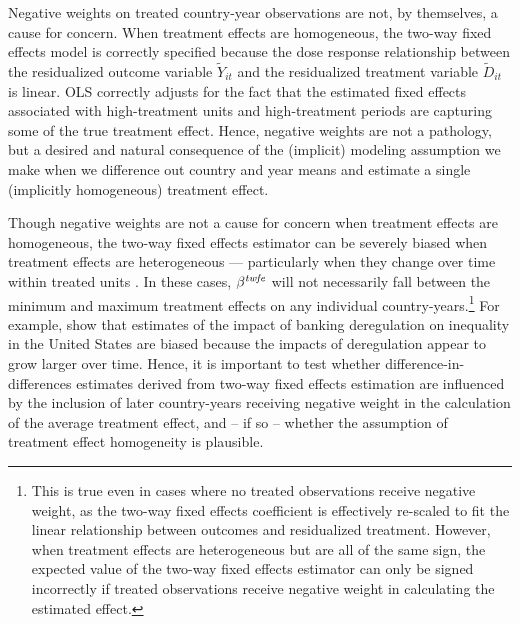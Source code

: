 \documentclass[11pt]{article}
\begin{document}
Negative weights on treated country-year observations are not, by themselves, a cause for concern.  When treatment effects are 
homogeneous, the two-way fixed effects model is correctly specified because the dose response relationship 
between the residualized outcome variable $\tilde{Y}_{it}$ and the residualized treatment variable $\tilde{D}_{it}$ is linear.  
OLS correctly adjusts for the fact that the estimated fixed effects associated with high-treatment units and high-treatment periods are capturing some of the true treatment effect.  Hence, negative weights are not a pathology, but a desired and natural consequence of the (implicit) modeling assumption we make when we difference out country and year means and estimate a single (implicitly homogeneous) treatment effect.


Though negative weights are not a cause for concern when treatment effects are homogeneous, the two-way fixed effects 
estimator can be severely biased when treatment effects are heterogeneous --- particularly when they change over time 
within treated units \cite{Chaisemartin2020,GoodmanBacon2020}.  In these cases, $\beta^{\textit{\scriptsize{twfe}}} $ 
will not necessarily fall between the minimum and maximum treatment effects on any individual country-years.\footnote{This is true  
even in cases where no treated observations receive negative weight, as 
the two-way fixed effects coefficient is effectively re-scaled to fit 
the linear relationship between outcomes and residualized treatment.  However, 
when treatment effects are heterogeneous but are all of the same sign, the expected value of the two-way fixed effects estimator can only be signed incorrectly if treated observations receive negative weight in calculating the estimated effect.  }
For example,  show that estimates 
of the impact of banking deregulation on inequality in the United States are biased because the impacts of deregulation 
appear to grow larger over time. Hence, it is important to test whether difference-in-differences estimates derived from 
two-way fixed effects estimation are influenced by the inclusion of later country-years receiving negative weight in 
the calculation of the average treatment effect, and -- if so -- whether the assumption of treatment effect homogeneity 
is plausible.
\end{document}
